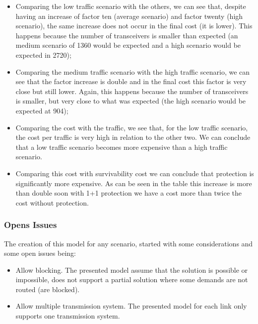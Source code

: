 \begin{itemize}
    \item Comparing the low traffic scenario with the others, we can see that, despite having an increase of factor ten (average scenario) and factor twenty (high scenario), the same increase does not occur in the final cost (it is lower). This happens because the number of transceivers is smaller than expected (an medium scenario of 1360 would be expected and a high scenario would be expected in 2720);
    \item Comparing the medium traffic scenario with the high traffic scenario, we can see that the factor increase is double and in the final cost this factor is very close but still lower. Again, this happens because the number of transceivers is smaller, but very close to what was expected (the high scenario would be expected at 904);
    \item Comparing the cost with the traffic, we see that, for the low traffic scenario, the cost per traffic is very high in relation to the other two. We can conclude that a low traffic scenario becomes more expensive than a high traffic scenario.
    \item Comparing this cost with survivability cost we can conclude that protection is significantly more expensive. As can be seen in the table this increase is more than double soon with 1+1 protection we have a cost more than twice the cost without protection.
\end{itemize}


\vspace{13pt}
\subsubsection{Opens Issues}

The creation of this model for any scenario, started with some considerations and some open issues being:

\begin{itemize}
  \item Allow blocking.
  \subitem The presented model assume that the solution is possible or impossible, does not support a partial solution where some demands are not routed (are blocked).
  \item Allow multiple transmission system.
  \subitem The presented model for each link only supports one transmission system.
\end{itemize}

